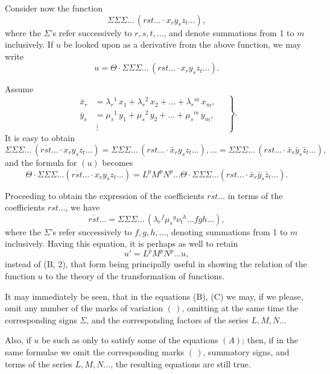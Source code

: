 \documentclass[11pt]{article}
\begin{document}
Consider now the function
\[
\Sigma\Sigma\Sigma\ldots\,(rst\ldots \cdot x_r y_s z_t \ldots) \tag{19},
\]
where the $\Sigma$'s refer successively to $r, s, t, \ldots$, and denote summations from 1 to $m$
inclusively. If $u$ be looked upon as a derivative from the above function, we may write
\[
u = \Theta \cdot \Sigma\Sigma\Sigma\ldots\,(rst\ldots \cdot x_r y_s z_t \ldots) \tag{20}.
\]

Assume
\[
\left.
\begin{aligned}
\bar{x}_r &= \lambda_r{}^1\,x_1 + \lambda_r{}^2\,x_2 + \ldots + \lambda_r{}^m\,x_m,\\
\bar{y}_s &= \mu_s{}^1\,y_1 + \mu_s{}^2\,y_2 + \ldots + \mu_s{}^m\,y_m,\\
&\ \vdots
\end{aligned}\quad\right\} \tag{21}.
\]
It is easy to obtain
\[
\Sigma\Sigma\Sigma\ldots\,(\overline{rst}\ldots \cdot x_r y_s z_t \ldots) = \Sigma\Sigma\Sigma\ldots\,(rst\ldots \cdot \bar{x}_r y_s z_t \ldots),\ldots = \Sigma\Sigma\Sigma\ldots\,(rst\ldots \cdot \bar{x}_r \bar{y}_s \bar{z}_t \ldots) \tag{22},
\]
and the formula for $(u)$ becomes
\[
\Theta \cdot \Sigma\Sigma\Sigma\ldots(\overline{rst}\ldots\cdot x_r y_s z_t\ldots) = L^p M^p N^p \ldots \Theta \cdot \Sigma\Sigma\Sigma\ldots(rst\ldots\cdot \bar{x}_r \bar{y}_s \bar{z}_t\ldots) \tag{B, 2}.
\]

Proceeding to obtain the expression of the coefficients $\overline{rst}\ldots$ in terms of the
coefficients $rst\ldots$, we have
\[
\overline{rst}\ldots = \Sigma\Sigma\Sigma\ldots\,(\lambda_r{}^f \mu_s{}^g \nu_t{}^h \ldots fgh\ldots) \tag{C},
\]
where the $\Sigma$'s refer successively to $f, g, h, \ldots$, denoting summations from 1 to $m$
inclusively. Having this equation, it is perhaps as well to retain
\[
u' = L^p M^p N^p \ldots u \tag{B, 1},
\]
instead of (B, 2), that form being principally useful in showing the relation of the
function $u$ to the theory of the transformation of functions.

It may immediately be seen, that in the equations (B), (C) we may, if we please,
omit any number of the marks of variation $(\,)$, omitting at the same time the
corresponding signs $\Sigma$, and the corresponding factors of the series $L, M, N \ldots$

Also, if $u$ be such as only to satisfy some of the equations $(A)$; then, if in the
same formulae we omit the corresponding marks $(\,)$, summatory signs, and terms of the
series $L, M, N \ldots$, the resulting equations are still true.
\end{document}
